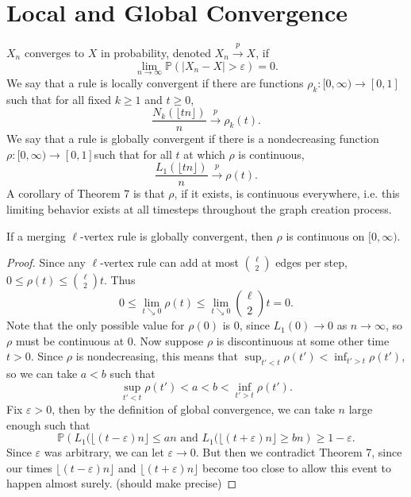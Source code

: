 \documentclass[twoside,10pt]{report}
\begin{document}
\section{Local and Global Convergence}

$X_{n}$ converges to $X$ in probability, denoted $X_{n} \stackrel{p}{\to } X$, if
\[
\lim_{n \to \infty} \mathbb{P}\left( |X_n-X|>\varepsilon \right) =0.
\] 
We say that a rule is locally convergent if there are functions $\rho_{k}:[0,\infty)\to [0,1]$ such that for all fixed $k \geq 1$ and $t \geq 0$,
\[
	\frac{N_{k}(\lfloor tn \rfloor)}{n} \stackrel{p}{\to } \rho_{k}(t).
\] 
We say that a rule is globally convergent if there is a nondecreasing function $\rho:[0,\infty)\to [0,1]$such that for all $t$ at which $\rho $ is continuous,
\[
	\frac{L_1(\lfloor tn \rfloor)}{n} \stackrel{p}{\to } \rho(t).
\] A corollary of Theorem 7 is that $\rho$, if it exists, is continuous everywhere, i.e. this limiting behavior exists at all timesteps throughout the graph creation process.

\setcounter{cor}{7}
\begin{cor}
	\label{cor:rho-cts}
	If a merging $\ell$-vertex rule is globally convergent, then $\rho$ is continuous on $[0,\infty)$.
\end{cor}
\begin{proof}
	Since any $\ell$-vertex rule can add at most $\binom{\ell}{2}$ edges per step, $0 \leq \rho(t) \leq \binom{\ell}{2}t$. Thus
	\[
		0 \leq \lim_{t \searrow 0} \rho(t) \leq \lim_{t \searrow 0} \binom{\ell}{2}t = 0.
	\] Note that the only possible value for $\rho(0)$ is 0, since $L_1(0) \to 0$ as $n\to \infty$, so $\rho$ must be continuous at 0. Now suppose $\rho$ is discontinuous at some other time $t > 0$. Since $\rho$ is nondecreasing, this means that $\sup_{t'<t}\rho(t') < \inf_{t'>t}\rho(t')$, so we can take $a<b$ such that
	\[
	\sup_{t'<t}\rho(t') < a < b < \inf_{t'>t}\rho(t').
	\] Fix $\varepsilon > 0$, then {\color{red}by the definition of global convergence}, we can take $n$ large enough such that
	\[
		\mathbb{P}\left( L_1(\lfloor (t-\varepsilon)n \rfloor \leq an \text{ and } L_1(\lfloor (t+\varepsilon)n \rfloor \geq bn \right) \geq 1-\varepsilon.
	\] Since $\varepsilon$ was arbitrary, we can let $\varepsilon\to 0$. But then we contradict Theorem 7, since our times $\lfloor (t-\varepsilon)n \rfloor$ and $\lfloor (t+\varepsilon)n \rfloor$ become too close to allow this event to happen almost surely. {\color{red}(should make precise)}
\end{proof}
\end{document}
